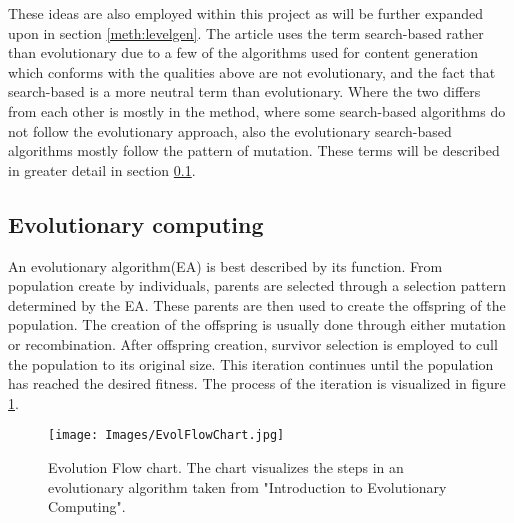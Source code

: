 \documentclass[a4paper,11pt]{article}
\begin{document}
These ideas are also employed within this project as will be further expanded upon in section \ref{meth:levelgen}. The article uses the term search-based rather than evolutionary due to a few of the algorithms used for content generation which conforms with the qualities above are not evolutionary, and the fact that search-based is a more neutral term than evolutionary. Where the two differs from each other is mostly in the method, where some search-based algorithms do not follow the evolutionary approach, also the evolutionary search-based algorithms mostly follow the pattern of mutation. These terms will be described in greater detail in section \ref{evolcomp}.

\subsection{Evolutionary computing}
\label{evolcomp}
An evolutionary algorithm(EA) is best described by its function. From population create by individuals, parents are selected through a selection pattern determined by the EA. These parents are then used to create the offspring of the population. The creation of the offspring is usually done through either mutation or recombination. After offspring creation, survivor selection is employed to cull the population to its original size. This iteration continues until the population has reached the desired fitness. The process of the iteration is visualized in figure \ref{fig:EvolFlowChart}.
\begin{figure}[h]
    \centering
    \texttt{[image: Images/EvolFlowChart.jpg]}
    \caption{Evolution Flow chart. The chart visualizes the steps in an evolutionary algorithm taken from "Introduction to Evolutionary Computing"\cite{EibenSmith2007}.}
    \label{fig:EvolFlowChart}
\end{figure}
\end{document}
